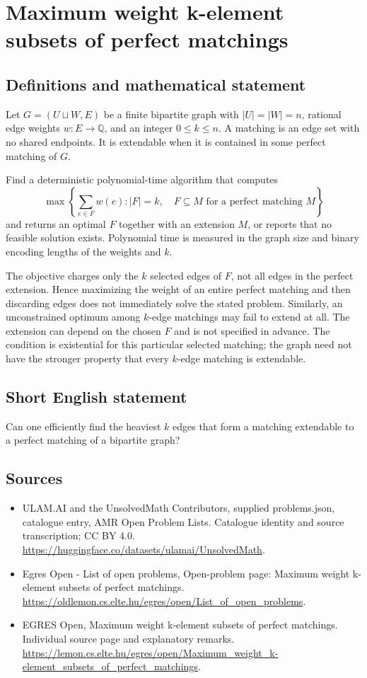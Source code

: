 \documentclass[11pt,a4paper]{article}
\begin{document}
\section*{Maximum weight k-element subsets of perfect matchings}\label{statement}

\subsection{Definitions and mathematical statement}
Let $G=(U\sqcup W,E)$ be a finite bipartite graph with $|U|=|W|=n$,
rational edge weights $w:E\to\mathbb Q$, and an integer $0\le k\le n$.
A matching is an edge set with no shared endpoints. It is extendable
when it is contained in some perfect matching of $G$.

Find a deterministic polynomial-time algorithm that computes
\[
       \max\left\{\sum_{e\in F}w(e):|F|=k,\quad
                     F\subseteq M\text{ for a perfect matching }M\right\}
\]
and returns an optimal $F$ together with an extension $M$, or reports
that no feasible solution exists. Polynomial time is measured in the
graph size and binary encoding lengths of the weights and $k$.

The objective charges only the $k$ selected edges of $F$, not all
edges in the perfect extension. Hence maximizing the weight of an
entire perfect matching and then discarding edges does not immediately
solve the stated problem. Similarly, an unconstrained optimum among
$k$-edge matchings may fail to extend at all. The extension can depend
on the chosen $F$ and is not specified in advance. The condition is
existential for this particular selected matching; the graph need not
have the stronger property that every $k$-edge matching is extendable.
\subsection{Short English statement}
Can one efficiently find the heaviest $k$ edges that form a
matching extendable to a perfect matching of a bipartite graph?
\subsection{Sources}
\begin{itemize}
\item[S1] ULAM.AI and the UnsolvedMath Contributors, supplied problems.json, catalogue entry, AMR Open Problem Lists. Catalogue identity and source transcription; CC BY 4.0.
\url{https://huggingface.co/datasets/ulamai/UnsolvedMath}.
\item[S2] Egres Open - List of open problems, Open-problem page: Maximum weight k-element subsets of perfect matchings. 
\url{https://oldlemon.cs.elte.hu/egres/open/List_of_open_problems}.
\item[S3] EGRES Open, Maximum weight k-element subsets of perfect matchings. Individual source page and explanatory remarks.
\url{https://lemon.cs.elte.hu/egres/open/Maximum_weight_k-element_subsets_of_perfect_matchings}.
\end{itemize}
\end{document}
